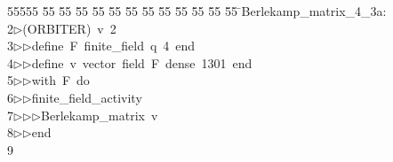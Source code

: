 %
%
\begin{tabbing}
55555 \= 55 \= 55 \= 55 \= 55 \= 55 \= 55 \= 55 \= 55 \= 55 \= 55 \= 55 \= 55 \= \>Berlekamp\_matrix\_4\_3a:\\[0pt]
2\>$\triangleright$\>(ORBITER)\ v\ 2\ \\[0pt]
3\>$\triangleright$\>$\triangleright$\>define\ F\ finite\_field\ q\ 4\ end\ \\[0pt]
4\>$\triangleright$\>$\triangleright$\>define\ v\ vector\ field\ F\ dense\ 1301\ end\ \\[0pt]
5\>$\triangleright$\>$\triangleright$\>with\ F\ do\ \\[0pt]
6\>$\triangleright$\>$\triangleright$\>finite\_field\_activity\ \\[0pt]
7\>$\triangleright$\>$\triangleright$\>$\triangleright$\>Berlekamp\_matrix\ v\ \\[0pt]
8\>$\triangleright$\>$\triangleright$\>end\\[0pt]
9\>\end{tabbing}
